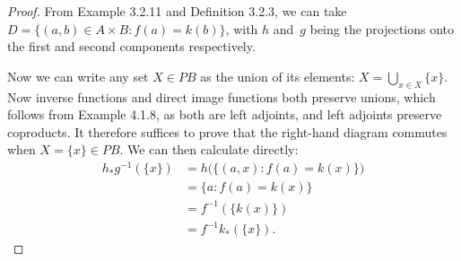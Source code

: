 \documentclass[../../solutions]{subfiles}
\begin{document}
\begin{proof}[Proof]
  From Example 3.2.11 and Definition 3.2.3, we can take
  $D=\{(a,b)\in A\times B:f(a)=k(b)\}$, with $h$ and~$g$
  being the projections onto the first and second components
  respectively.

  Now we can write any set $X\in PB$ as the union of its elements:
  $X=\bigcup_{x\in X}\{x\}$.  Now inverse functions and direct image
  functions both preserve unions, which follows from Example 4.1.8, as
  both are left adjoints, and left adjoints preserve coproducts.  It
  therefore suffices to prove that the right-hand diagram commutes
  when $X=\{x\}\in PB$.  We can then calculate directly:
  \begin{align*}
    h_*g^{-1}(\{x\})
      &= h\bigl(\{(a,x):f(a)=k(x)\}\bigr) \\
      &= \{a:f(a)=k(x)\} \\
      &= f^{-1}(\{k(x)\}) \\
      &= f^{-1}k_*(\{x\}).
  \end{align*}
\end{proof}
\end{document}
